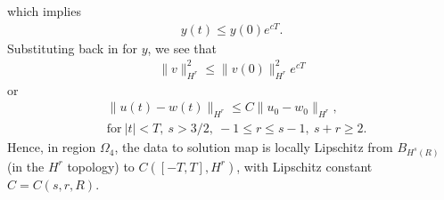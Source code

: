 \documentclass[12pt,reqno]{amsart}
\numberwithin{equation}{section}  %
\numberwithin{figure}{section}
\begin{document}
%
%
which implies
%
%
\begin{equation*}
\begin{split}
  y(t) \le y(0) e^{cT}.
\end{split}
\end{equation*}
%
%
Substituting back in for $y$, we see that
%
%
\begin{equation*}
\begin{split}
  \| v \|_{H^{r}}^{2} \le \| v(0) \|^{2}_{H^{r}} e^{cT}
\end{split}
\end{equation*}
%
%
or
%
%
\begin{equation}
  \label{lip-ineq}
\begin{split}
  & \| u(t) - w(t) \|_{H^{r}} \le C \| u_{0} - w_{0} \|_{H^{r}}, 
  \\
  & \text{for} \ | t | < T,
  \ s > 3/2, \ -1 \le r \le s-1, \ s + r \ge 2.
\end{split}
\end{equation}
%
Hence, in region $\Omega_{4}$, the data to solution map is locally Lipschitz from
$B_{H^{s}(R)}$ (in the $H^{r}$
topology) to $C([-T, T], H^{r})$, with Lipschitz constant $C = C(s, r, R)$.
%
%
%
%
%
%
%
%
%
%
\end{document}
